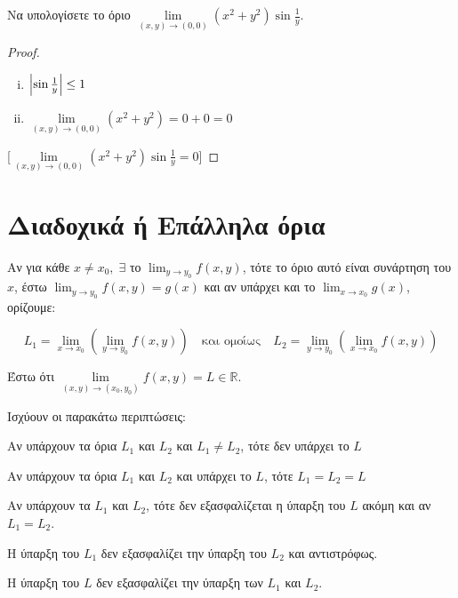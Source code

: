 \begin{example}
    Να υπολογίσετε το όριο $ \lim\limits_{(x,y)\to (0, 0)} (x^{2}+y^{2}) 
    \sin{\frac{1}{y}} $.  

    \begin{proof}
    \item {}
        \begin{minipage}{0.4\textwidth}
            \begin{enumerate}[i)]
                \item $ \abs{\sin{\frac{1}{y}}} \leq 1 $ \hfill {}
                \item $ \lim\limits_{(x,y)\to (0, 0)} (x^{2}+y^{2}) = 0+0=0 $ 
                    \hfill {}
            \end{enumerate}
        \end{minipage}
        [$ \lim\limits_{(x,y)\to (0, 0)} (x^{2}+y^{2}) \sin{\frac{1}{y}} 
        = 0$]
    \end{proof}
\end{example}


\section{Διαδοχικά ή Επάλληλα όρια}

Αν για κάθε $ x \neq x_{0}, \; \exists $ το $ \lim_{y \to y_{0}} f(x,y) $, τότε το όριο 
αυτό είναι συνάρτηση του $x$, έστω $ \lim_{y \to y_{0}} f(x,y) = g(x) $ και 
αν υπάρχει και το $ \lim_{x \to x_{0}} g(x) $, ορίζουμε: 

\[
    L_{1} = \lim_{x \to x_{0}} \left(\lim_{y \to y_{0}} f(x,y)\right) 
    \quad \text{και ομοίως} \quad
    L_{2} = \lim_{y \to y_{0}} \left(\lim_{x \to x_{0}} f(x,y)\right) 
 \] 

Έστω ότι $ \lim\limits_{(x,y)\to (x_{0}, y_{0})} f(x,y) = L \in \mathbb{R} $.

Ισχύουν οι παρακάτω περιπτώσεις:
\begin{myitemize}
\item Αν υπάρχουν τα όρια $ L_{1} $ και $ L_{2} $ και $ L_{1} \neq L_{2} $, τότε
    δεν υπάρχει το $ L $
\item Αν υπάρχουν τα όρια $ L_{1} $ και $ L_{2} $ και υπάρχει το $ L $, τότε
    $ L_{1}=L_{2}=L $
\item Αν υπάρχουν τα $ L_{1} $ και $ L_{2} $, τότε δεν εξασφαλίζεται η ύπαρξη του 
    $ L $ ακόμη και αν $ L_{1}=L_{2} $.
\item Η ύπαρξη του $ L_{1} $ δεν εξασφαλίζει την ύπαρξη του $ L_{2} $ και αντιστρόφως.
\item Η ύπαρξη του $ L $ δεν εξασφαλίζει την ύπαρξη των $ L_{1} $ και $ L_{2} $.
\end{myitemize}

